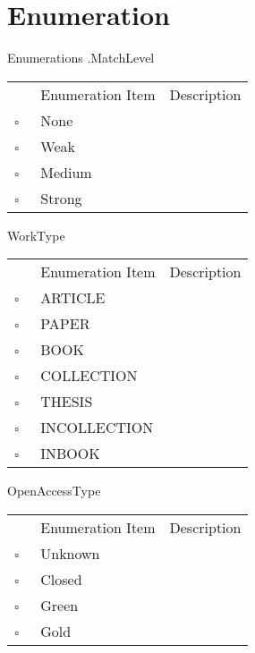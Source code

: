 \chapter{Enumeration}
Enumerations     .MatchLevel   
\begin{longtable}{llp{8cm}}
& Enumeration Item & Description \\
$\square$\ & None &  \\
$\square$\ & Weak &  \\
$\square$\ & Medium &  \\
$\square$\ & Strong &  \\
\end{longtable}
WorkType   
\begin{longtable}{llp{8cm}}
& Enumeration Item & Description \\
$\square$\ & ARTICLE &  \\
$\square$\ & PAPER &  \\
$\square$\ & BOOK &  \\
$\square$\ & COLLECTION &  \\
$\square$\ & THESIS &  \\
$\square$\ & INCOLLECTION &  \\
$\square$\ & INBOOK &  \\
\end{longtable}
OpenAccessType   
\begin{longtable}{llp{8cm}}
& Enumeration Item & Description \\
$\square$\ & Unknown &  \\
$\square$\ & Closed &  \\
$\square$\ & Green &  \\
$\square$\ & Gold &  \\
\end{longtable}
